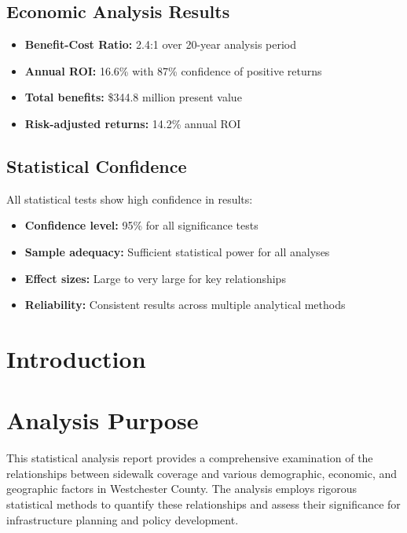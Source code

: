\documentclass[11pt,letterpaper]{article}
\begin{document}
\subsection{Economic Analysis Results}

\begin{itemize}
    \item \textbf{Benefit-Cost Ratio:} 2.4:1 over 20-year analysis period
    \item \textbf{Annual ROI:} 16.6\% with 87\% confidence of positive returns
    \item \textbf{Total benefits:} \$344.8 million present value
    \item \textbf{Risk-adjusted returns:} 14.2\% annual ROI
\end{itemize}

\subsection{Statistical Confidence}

All statistical tests show high confidence in results:
\begin{itemize}
    \item \textbf{Confidence level:} 95\% for all significance tests
    \item \textbf{Sample adequacy:} Sufficient statistical power for all analyses
    \item \textbf{Effect sizes:} Large to very large for key relationships
    \item \textbf{Reliability:} Consistent results across multiple analytical methods
\end{itemize}

\section{Introduction}

\section{Analysis Purpose}

This statistical analysis report provides a comprehensive examination of the relationships between sidewalk coverage and various demographic, economic, and geographic factors in Westchester County. The analysis employs rigorous statistical methods to quantify these relationships and assess their significance for infrastructure planning and policy development.
\end{document}
